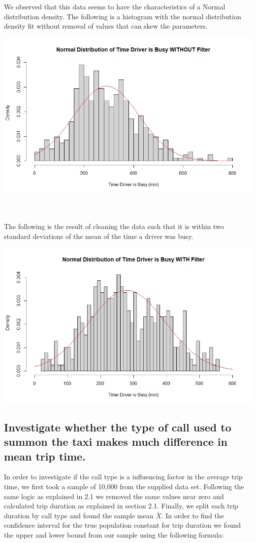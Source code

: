 \documentclass{article}
\numberwithin{equation}{section}
\begin{document}
We observed that this data seems to have the characteristics of a Normal distribution density. The following is a histogram with the normal distribution density fit without removal of values that can skew the parameters.
\begin{center}
\includegraphics[scale=0.5]{isBusy_noFilter.jpeg} \\
\end{center}
\\
\\
The following is the result of cleaning the data such that it is within two standard deviations of the mean of the time a driver was busy.
\begin{center}
\includegraphics[scale=0.5]{isBusy_filtered2.jpeg}
\end{center}
\newpage
\subsection{Investigate whether the type of call used to summon the taxi makes much difference in mean trip time.}
In order to investigate if the call type is a influencing factor in the average trip time, we first took a sample of 10,000 from the supplied data set. Following the same logic as explained in 2.1 we removed the same values near zero and calculated trip duration as explained in section 2.1. Finally, we split each trip duration by call type and found the sample mean $\bar{X}$. In order to find the confidence interval for the true population constant for trip duration we found the upper and lower bound from our sample using the following formula:
\end{document}

